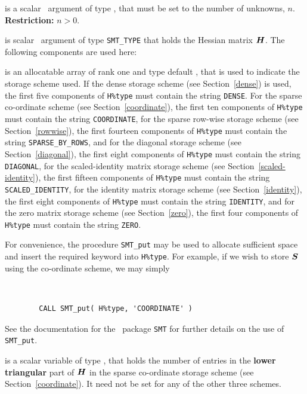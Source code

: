 \documentclass{galahad}
\begin{document}
\begin{description}

 is a scalar \intentin\ argument of type \integer, that must be
set to the number of unknowns, $n$. {\bf Restriction: } $n  >  0$.

 is scalar \intentin\ argument of type {\tt SMT\_TYPE}
that holds the Hessian matrix ${\bm{H}}$. The following components
are used here:

\begin{description}

 is an allocatable array of rank one and type default
\character, that
is used to indicate the storage scheme used. If the dense storage scheme
(see Section~\ref{dense}) is used,
the first five components of {\tt H\%type} must contain the
string {\tt DENSE}.
For the sparse co-ordinate scheme (see Section~\ref{coordinate}),
the first ten components of {\tt H\%type} must contain the
string {\tt COORDINATE},
for the sparse row-wise storage scheme (see Section~\ref{rowwise}),
the first fourteen components of {\tt H\%type} must contain the
string {\tt SPARSE\_BY\_ROWS},
and for the diagonal storage scheme (see Section~\ref{diagonal}),
the first eight components of {\tt H\%type} must contain the
string {\tt DIAGONAL},
for the scaled-identity matrix storage scheme
(see Section~\ref{scaled-identity}),
the first fifteen components of {\tt H\%type} must contain the
string {\tt SCALED\_IDENTITY},
for the identity matrix storage scheme
(see Section~\ref{identity}),
the first eight components of {\tt H\%type} must contain the
string {\tt IDENTITY}, and
for the zero matrix storage scheme
(see Section~\ref{zero}),
the first four components of {\tt H\%type} must contain the
string {\tt ZERO}.

For convenience, the procedure {\tt SMT\_put}
may be used to allocate sufficient space and insert the required keyword
into {\tt H\%type}.
For example, if we wish to store ${\bm{S}}$ using the co-ordinate scheme,
we may simply
{\tt
\begin{verbatim}
        CALL SMT_put( H%type, 'COORDINATE' )
\end{verbatim}
}
\noindent
See the documentation for the \galahad\ package {\tt SMT}
for further details on the use of {\tt SMT\_put}.

 is a scalar variable of type \integer, that
holds the number of entries in the {\bf lower triangular} part of ${\bm{H}}$
in the sparse co-ordinate storage scheme (see Section~\ref{coordinate}).
It need not be set for any of the other three schemes.


\end{description}
\end{description}
\end{document}
